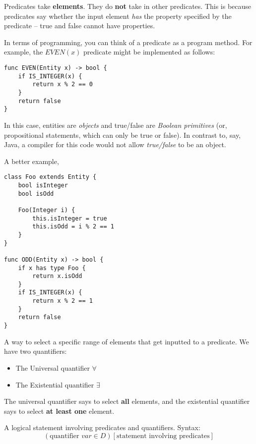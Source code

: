 \documentclass[main.tex]{subfiles}
\begin{document}
\begin{rem}
	Predicates take \textbf{elements}. They do \textbf{not} take in other predicates. This is because predicates say whether the input element \textit{has} the property specified by the predicate -- true and false cannot have properties.
	
	In terms of programming, you can think of a predicate as a program method. For example, the \(EVEN(x)\) predicate might be implemented as follows:
	
	\begin{lstlisting}
func EVEN(Entity x) -> bool {
	if IS_INTEGER(x) {
		return x % 2 == 0
	}
	return false
}
	\end{lstlisting}
	
	In this case, entities are \textit{objects} and true/false are \textit{Boolean primitives} (or, propositional statements, which can only be true or false). In contrast to, say, Java, a compiler for this code would not allow \textit{true/false} to be an object.
	
	A better example,
	
	\begin{lstlisting}
class Foo extends Entity {
	bool isInteger
	bool isOdd
	
	Foo(Integer i) {
		this.isInteger = true
		this.isOdd = i % 2 == 1
	}
}

func ODD(Entity x) -> bool {
	if x has type Foo {
		return x.isOdd
	}
	if IS_INTEGER(x) {
		return x % 2 == 1
	}
	return false
}
	\end{lstlisting}
\end{rem}

\begin{defn}
	A way to select a specific range of elements that get inputted to a predicate. We have two quantifiers:
	
	\begin{itemize}
		\item The Universal quantifier \(\forall\)
		\item The Existential quantifier \(\exists\)
	\end{itemize}

	The universal quantifier says to select \textbf{all} elements, and the existential quantifier says to select \textbf{at least one} element.
\end{defn}

\begin{defn}
	A logical statement involving predicates and quantifiers. Syntax: \[(\text{quantifier } var \in D)[\text{statement involving predicates}]\]
\end{defn}
\end{document}
